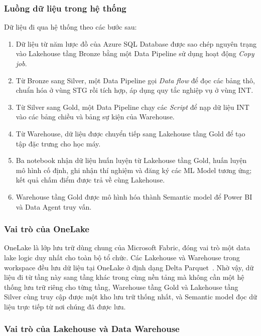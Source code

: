 \subsubsection{Luồng dữ liệu trong hệ thống}

Dữ liệu đi qua hệ thống theo các bước sau:

\begin{enumerate}[nosep]
\item Dữ liệu từ năm lược đồ của Azure SQL Database được sao chép nguyên trạng vào Lakehouse tầng Bronze bằng một Data Pipeline sử dụng hoạt động \textit{Copy job}.
\item Từ Bronze sang Silver, một Data Pipeline gọi \textit{Data flow} để đọc các bảng thô, chuẩn hóa ở vùng STG rồi tích hợp, áp dụng quy tắc nghiệp vụ ở vùng INT.
\item Từ Silver sang Gold, một Data Pipeline chạy các \textit{Script} để nạp dữ liệu INT vào các bảng chiều và bảng sự kiện của Warehouse.
\item Từ Warehouse, dữ liệu được chuyển tiếp sang Lakehouse tầng Gold để tạo tập đặc trưng cho học máy.
\item Ba notebook nhận dữ liệu huấn luyện từ Lakehouse tầng Gold, huấn luyện mô hình cố định, ghi nhận thí nghiệm và đăng ký các ML Model tương ứng; kết quả chấm điểm được trả về cùng Lakehouse.
\item Warehouse tầng Gold được mô hình hóa thành Semantic model để Power BI và Data Agent truy vấn.
\end{enumerate}

\subsubsection{Vai trò của OneLake}

OneLake là lớp lưu trữ dùng chung của Microsoft Fabric, đóng vai trò một data lake logic duy nhất cho toàn bộ tổ chức. Các Lakehouse và Warehouse trong workspace đều lưu dữ liệu tại OneLake ở định dạng Delta Parquet~\citep{microsoft-onelake}. Nhờ vậy, dữ liệu đi từ tầng này sang tầng khác trong cùng nền tảng mà không cần một hệ thống lưu trữ riêng cho từng tầng, Warehouse tầng Gold và Lakehouse tầng Silver cùng truy cập được một kho lưu trữ thống nhất, và Semantic model đọc dữ liệu trực tiếp từ nơi chúng đã được lưu.

\subsubsection{Vai trò của Lakehouse và Data Warehouse}

